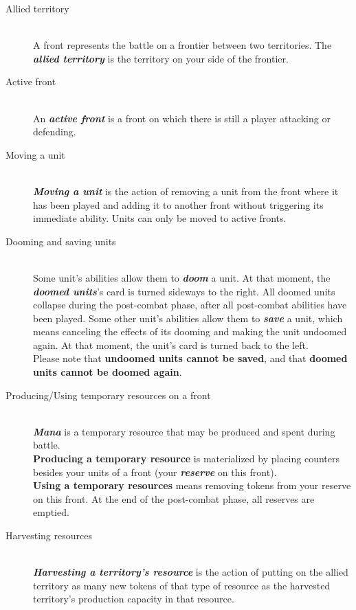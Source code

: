 \documentclass[a4paper]{article}
\begin{document}
    \begin{description}
        \item[Allied territory] \hfill \\
        A front represents the battle on a frontier between two territories.
        The \textbf{\textit{allied territory}} is the territory on
        your side of the frontier.
        \item[Active front] \hfill \\
        An \textbf{\textit{active front}} is a front on which there is still a player
        attacking or defending.
        \item[Moving a unit] \hfill \\
        \textbf{\textit{Moving a unit}} is the action of removing a unit from the front
        where it has been played and adding it to another front without triggering
        its immediate ability.
        Units can only be moved to active fronts.
        \item[Dooming and saving units] \hfill \\
        Some unit's abilities allow them to \textbf{\textit{doom}} a unit.
        At that moment, the \textbf{\textit{doomed units}}'s card is turned
        sideways to the right.
        All doomed units collapse during the post-combat phase,
        after all post-combat abilities have been played.
        Some other unit's abilities allow them to \textbf{\textit{save}} a unit,
        which means canceling the effects of its dooming and making the unit
        undoomed again.
        At that moment, the unit's card is turned back to the left.\\
        Please note that \textbf{undoomed units cannot be saved},
        and that \textbf{doomed units cannot be doomed again}.
        \item[Producing/Using temporary resources on a front] \hfill \\
        \textbf{\textit{Mana}} is a temporary resource that may be produced
        and spent during battle.\\
        \textbf{Producing a temporary resource} is materialized by placing counters
        besides your units of a front (your \textit{\textbf{reserve}} on this front).\\
        \textbf{Using a temporary resources} means removing tokens from your reserve on
        this front.
        At the end of the post-combat phase, all reserves are emptied.
        \item[Harvesting resources] \hfill \\
        \textbf{\textit{Harvesting a territory's resource}} is the action of
        putting on the allied territory as many new tokens of that type of resource
        as the harvested territory's production capacity in that resource.
    \end{description}
\end{document}
